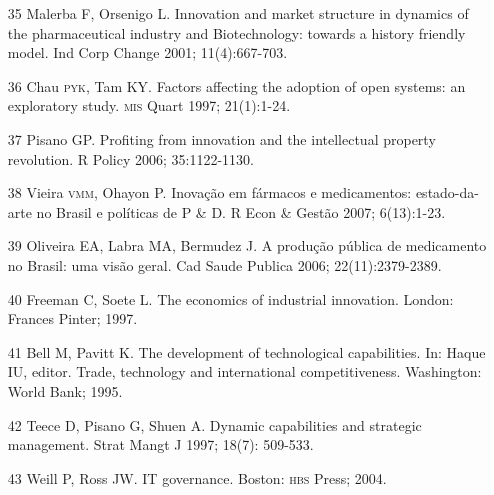 \documentclass{article}
\begin{document}
\begin{itemize}
\item[35] Malerba F, Orsenigo L. Innovation and market structure in dynamics
of the pharmaceutical industry and Biotechnology: towards a history friendly
model. Ind Corp Change 2001; 11(4):667-703.

\item[36] Chau \textsc{pyk}, Tam KY. Factors affecting the adoption of open systems:
an exploratory study. \textsc{mis} Quart 1997; 21(1):1-24.

\item[37] Pisano GP. Profiting from innovation and the intellectual property
revolution. R Policy 2006; 35:1122-1130.

\item[38] Vieira \textsc{vmm}, Ohayon P. Inovação em fármacos e medicamentos:
estado-da-arte no Brasil e políticas de P \& D. R Econ \& Gestão 2007;
6(13):1-23.

\item[39] Oliveira EA, Labra MA, Bermudez J. A produção pública de
medicamento no Brasil: uma visão geral. Cad Saude Publica 2006;
22(11):2379-2389.

\item[40] Freeman C, Soete L. The economics of industrial innovation.
London: Frances Pinter; 1997.

\item[41] Bell M, Pavitt K. The development of technological capabilities.
In: Haque IU, editor. Trade, technology and international competitiveness.
Washington: World Bank; 1995.

\item[42] Teece D, Pisano G, Shuen A. Dynamic capabilities and strategic
management. Strat Mangt J 1997; 18(7): 509-533.

\item[43] Weill P, Ross JW. IT governance. Boston: \textsc{hbs} Press; 2004.

\end{itemize}
\end{document}
